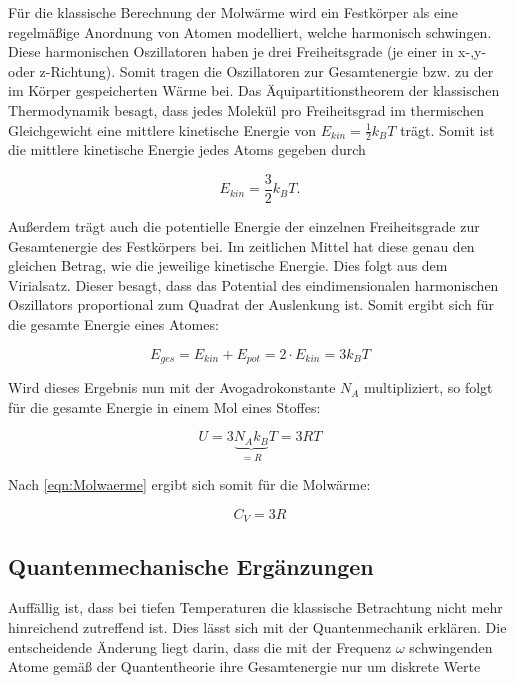 Für die klassische Berechnung der Molwärme wird ein Festkörper
als eine regelmäßige Anordnung von Atomen modelliert, welche 
harmonisch schwingen. Diese harmonischen Oszillatoren haben je 
drei Freiheitsgrade (je einer in x-,y- oder z-Richtung). Somit 
tragen die Oszillatoren zur Gesamtenergie bzw. zu der im Körper
gespeicherten Wärme bei.
Das Äquipartitionstheorem der klassischen Thermodynamik besagt,
dass jedes Molekül pro Freiheitsgrad im thermischen 
Gleichgewicht eine mittlere kinetische Energie von 
$E_{kin} = \frac{1}{2} k_B T$ trägt. Somit ist die mittlere
kinetische Energie jedes Atoms gegeben durch

\begin{equation}
E_ {kin} = \frac{3}{2} k_B T.
\end{equation}

Außerdem trägt auch die potentielle Energie der einzelnen 
Freiheitsgrade zur Gesamtenergie des Festkörpers bei. 
Im zeitlichen Mittel hat diese genau den gleichen Betrag, 
wie die jeweilige kinetische Energie. Dies folgt aus dem 
Virialsatz. Dieser besagt, dass das Potential des 
eindimensionalen harmonischen Oszillators proportional zum
Quadrat der Auslenkung ist. Somit ergibt sich für die
gesamte Energie eines Atomes:

\begin{equation*}
E_{ges} = E_ {kin} + E_ {pot} = 2\cdot E_ {kin} = 3 k_B T 
\end{equation*}

Wird dieses Ergebnis nun mit der Avogadrokonstante
$N_A$ multipliziert, so folgt für die gesamte Energie 
in einem Mol eines Stoffes: 

\begin{equation}
U = 3\underbrace{N_A k_B}_{=R} T = 3 R T 
\label{eqn:innereEnergie}
\end{equation}

Nach \eqref{eqn:Molwaerme} ergibt sich somit für die Molwärme:

\begin{equation*}
C_V = 3 R 
\end{equation*}

\subsection{Quantenmechanische Ergänzungen}
\label{sec:Quanten}

Auffällig ist, dass bei tiefen Temperaturen die klassische 
Betrachtung nicht mehr hinreichend zutreffend ist. Dies 
lässt sich mit der Quantenmechanik erklären.
Die entscheidende Änderung liegt darin, dass die mit der 
Frequenz $\omega$ schwingenden Atome gemäß der Quantentheorie
ihre Gesamtenergie nur um diskrete Werte

